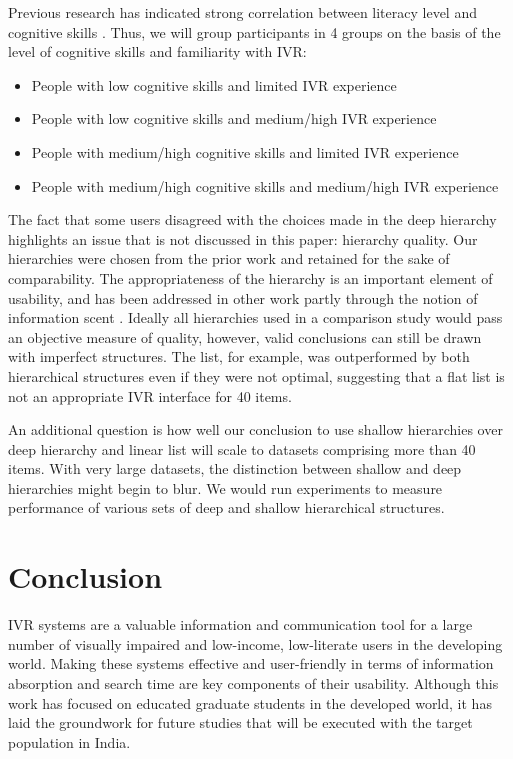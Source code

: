 \documentclass{sigchi}
\begin{document}
Previous research has indicated strong correlation between literacy level and cognitive skills \cite{Reis2001,Medhi2013a}. Thus, we will group participants in 4 groups on the basis of the level of cognitive skills and familiarity with IVR:

\begin{itemize}
\item People with low cognitive skills and limited IVR experience
\item People with low cognitive skills and medium/high IVR experience
\item People with medium/high cognitive skills and limited IVR experience
\item People with medium/high cognitive skills and medium/high IVR experience
\end{itemize}

The fact that some users disagreed with the choices made in the deep hierarchy highlights an issue that is not discussed in this paper: hierarchy quality. Our hierarchies were chosen from the prior work \cite{Medhi2013a,Medhi2013b} and retained for the sake of comparability. The appropriateness of the hierarchy is an important element of usability, and has been addressed in other work partly through the notion of information scent \cite{Pirolli2003}. Ideally all hierarchies used in a comparison study would pass an objective measure of quality, however, valid conclusions can still be drawn with imperfect structures. The list, for example, was outperformed by both hierarchical structures even if they were not optimal, suggesting that a flat list is not an appropriate IVR interface for 40 items.

An additional question is how well our conclusion to use shallow hierarchies over deep hierarchy and linear list will scale to datasets comprising more than 40 items. With very large datasets, the distinction between shallow and deep hierarchies might begin to blur. We would run experiments to measure performance of various sets of deep and shallow hierarchical structures.

\section{Conclusion}

IVR systems are a valuable information and communication tool for a large number of visually impaired and low-income, low-literate users in the developing world. Making these systems effective and user-friendly in terms of information absorption and search time are key components of their usability. Although this work has focused on educated graduate students in the developed world, it has laid the groundwork for future studies that will be executed with the target population in India.
\end{document}
